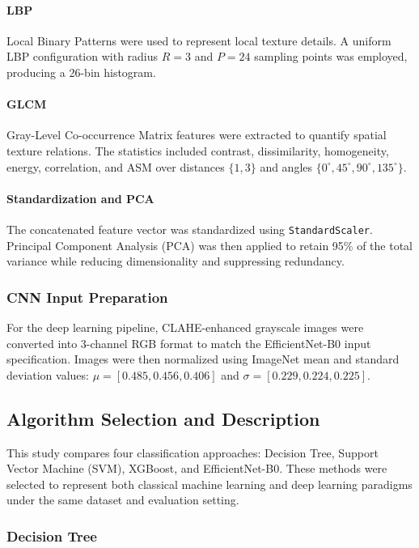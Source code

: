 \documentclass[conference]{IEEEtran}
\begin{document}
\paragraph{LBP}
Local Binary Patterns were used to represent local texture details. A uniform LBP configuration with radius $R=3$ and $P=24$ sampling points was employed, producing a 26-bin histogram.

\paragraph{GLCM}
Gray-Level Co-occurrence Matrix features were extracted to quantify spatial texture relations. The statistics included contrast, dissimilarity, homogeneity, energy, correlation, and ASM over distances $\{1, 3\}$ and angles $\{0^\circ, 45^\circ, 90^\circ, 135^\circ\}$.

\paragraph{Standardization and PCA}
The concatenated feature vector was standardized using \texttt{StandardScaler}. Principal Component Analysis (PCA) was then applied to retain 95\% of the total variance while reducing dimensionality and suppressing redundancy.

\subsubsection{CNN Input Preparation}

For the deep learning pipeline, CLAHE-enhanced grayscale images were converted into 3-channel RGB format to match the EfficientNet-B0 input specification. Images were then normalized using ImageNet mean and standard deviation values: $\mu = [0.485, 0.456, 0.406]$ and $\sigma = [0.229, 0.224, 0.225]$.

\subsection{Algorithm Selection and Description}

This study compares four classification approaches: Decision Tree, Support Vector Machine (SVM), XGBoost, and EfficientNet-B0. These methods were selected to represent both classical machine learning and deep learning paradigms under the same dataset and evaluation setting.

\subsubsection{Decision Tree}
\end{document}
